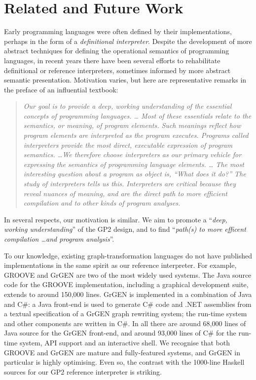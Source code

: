 \section{Related and Future Work}
\label{sec:relatedandfuture}
Early programming languages were often defined by their implementations,
perhaps in the form of a \emph{definitional interpreter}.
Despite the development of more abstract techniques
for defining the operational semantics of programming languages, in recent years there
have been several efforts to rehabilitate definitional or
reference interpreters, sometimes informed by more abstract semantic
presentation.
Motivation varies, but here are representative remarks in the preface
of an influential textbook: 
\begin{quote}
\textit{Our goal is to provide a deep, working understanding of the essential concepts of programming languages. \ldots
Most of these essentials relate to the semantics, or meaning, of program elements. Such meanings reflect how program elements are interpreted as the program executes. Programs called interpreters provide the most direct, executable expression of program semantics. \ldots We therefore choose interpreters as our primary vehicle for expressing the semantics of programming language elements. \ldots
The most interesting question about a program as object is, \textnormal{``What does it do?''} The study of interpreters tells us this. Interpreters are critical because they reveal nuances of meaning, and are the direct path to more efficient compilation and to other kinds of program analyses.} \cite{Friedmanetal2008}
\end{quote}
In several respects, our motivation is similar.  We aim to promote a ``\textit{deep, working understanding}'' of the GP2 design, and to find ``\textit{path(s) to more efficent compilation \ldots and program analysis}''.

To our knowledge, existing graph-transformation languages do not have published implementations
in the same spirit as our reference interpreter.
For example, GROOVE\cite{Ghamarianetal12} and GrGEN\cite{JakumeitBuchwaldKroll2010}
are two of the most widely used systems.
The Java source code for the GROOVE implementation, including a graphical development suite,
extends to around 150,000 lines.
GrGEN is implemented in a combination of Java and C\#:
a Java front-end is used to generate C\# code and
.NET assemblies from a textual specification of a GrGEN graph rewriting system;
the run-time system and other components are written in C\#. 
In all there are around 68,000 lines of Java source for the GrGEN front-end,
and around 93,000 lines of C\# for the run-time system, API support and an interactive shell.
We recognise that both GROOVE and GrGEN are mature and fully-featured systems,
and GrGEN in particular is highly optimising.
Even so, the contrast with the 1000-line Haskell sources for our GP2 reference interpreter
is striking.

